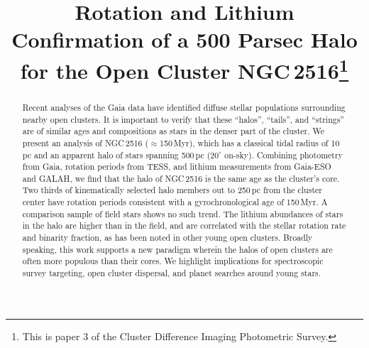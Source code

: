 \documentclass[12pt,twocolumn,tighten]{aastex63}
\begin{document}

\title{
  Rotation and Lithium Confirmation of a 500 Parsec Halo for the Open
  Cluster NGC\,2516\footnote{This is paper 3 of the Cluster Difference
  Imaging Photometric Survey.}
}



%
%
\begin{abstract}
Recent analyses of the Gaia data have identified diffuse stellar
populations surrounding nearby open clusters.  It is important to
verify that these ``halos'', ``tails'', and ``strings'' are of
similar ages and compositions as stars in the denser part of the
cluster.  We present an analysis of NGC\,2516 ($\approx$150\,Myr),
which has a classical tidal radius of 10\,pc and an apparent halo of
stars spanning 500\,pc ($20^\circ$ on-sky).  Combining photometry
from Gaia, rotation periods from TESS, and lithium measurements from
Gaia-ESO and GALAH, we find that the halo of NGC\,2516 is the same
age as the cluster's core.  Two thirds of kinematically selected
halo members out to 250\,pc from the cluster center have rotation
periods consistent with a gyrochronological age of 150\,Myr.  A
comparison sample of field stars shows no such trend.  The lithium
abundances of stars in the halo are higher than in the field, and
are correlated with the stellar rotation rate and binarity fraction,
as has been noted in other young open clusters.  Broadly speaking,
this work supports a new paradigm wherein the halos of open clusters
are often more populous than their cores.  We highlight implications
for spectroscopic survey targeting, open cluster dispersal, and
planet searches around young stars.
\end{abstract}


\end{document}
